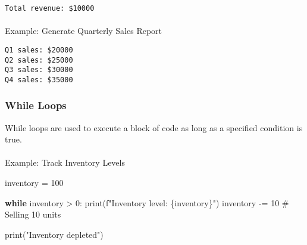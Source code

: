 \documentclass[
  letterpaper,
  DIV=11,
  numbers=noendperiod]{scrreprt}
\makeatletter
\let\oldparagraph\paragraph
\renewcommand{\paragraph}{
    \@ifstar
      \xxxParagraphStar
      \xxxParagraphNoStar
  }
\newcommand{\xxxParagraphStar}[1]{\oldparagraph*{#1}\mbox{}}
\newcommand{\xxxParagraphNoStar}[1]{\oldparagraph{#1}\mbox{}}
\newenvironment{Shaded}{\begin{snugshade}}{\end{snugshade}}
\newcommand{\BuiltInTok}[1]{\textcolor[rgb]{0.00,0.23,0.31}{#1}}
\newcommand{\CommentTok}[1]{\textcolor[rgb]{0.37,0.37,0.37}{#1}}
\newcommand{\ControlFlowTok}[1]{\textcolor[rgb]{0.00,0.23,0.31}{\textbf{#1}}}
\newcommand{\DecValTok}[1]{\textcolor[rgb]{0.68,0.00,0.00}{#1}}
\newcommand{\KeywordTok}[1]{\textcolor[rgb]{0.00,0.23,0.31}{\textbf{#1}}}
\newcommand{\NormalTok}[1]{\textcolor[rgb]{0.00,0.23,0.31}{#1}}
\newcommand{\OperatorTok}[1]{\textcolor[rgb]{0.37,0.37,0.37}{#1}}
\newcommand{\SpecialCharTok}[1]{\textcolor[rgb]{0.37,0.37,0.37}{#1}}
\newcommand{\SpecialStringTok}[1]{\textcolor[rgb]{0.13,0.47,0.30}{#1}}
\newcommand{\StringTok}[1]{\textcolor[rgb]{0.13,0.47,0.30}{#1}}
\makeatother
\begin{document}
\begin{verbatim}
Total revenue: $10000
\end{verbatim}

\paragraph{Example: Generate Quarterly Sales
Report}\label{example-generate-quarterly-sales-report}

\begin{Shaded}
\end{Shaded}

\begin{verbatim}
Q1 sales: $20000
Q2 sales: $25000
Q3 sales: $30000
Q4 sales: $35000
\end{verbatim}

\subsubsection{While Loops}\label{while-loops}

While loops are used to execute a block of code as long as a specified
condition is true.

\paragraph{Example: Track Inventory
Levels}\label{example-track-inventory-levels}

\begin{Shaded}
\begin{Highlighting}[]
\NormalTok{inventory }\OperatorTok{=} \DecValTok{100}

\ControlFlowTok{while}\NormalTok{ inventory }\OperatorTok{\textgreater{}} \DecValTok{0}\NormalTok{:}
    \BuiltInTok{print}\NormalTok{(}\SpecialStringTok{f"Inventory level: }\SpecialCharTok{\{}\NormalTok{inventory}\SpecialCharTok{\}}\SpecialStringTok{"}\NormalTok{)}
\NormalTok{    inventory }\OperatorTok{{-}=} \DecValTok{10}  \CommentTok{\# Selling 10 units}

\BuiltInTok{print}\NormalTok{(}\StringTok{"Inventory depleted"}\NormalTok{)}
\end{Highlighting}
\end{Shaded}
\end{document}
